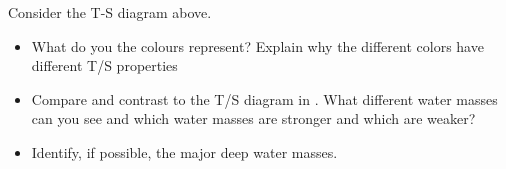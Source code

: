 Consider the T-S diagram above.  
\begin{itemize}
    \item What do you the colours represent?  Explain why the different colors have different T/S properties 
    \item Compare and contrast to the T/S diagram in .  What different water masses can you see and which water masses are stronger and which are weaker?
    \item Identify, if possible, the major deep water masses.
\end{itemize}


